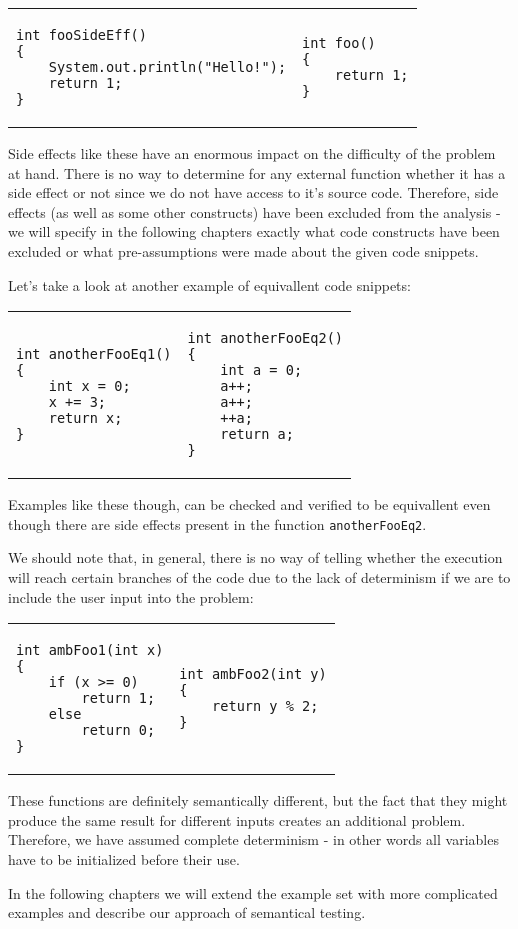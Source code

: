 \begin{tabular}{ p{4.5cm} p{4.5cm} }
\begin{lstlisting}
int fooSideEff()
{
    System.out.println("Hello!");
    return 1;
}
\end{lstlisting}
&
\begin{lstlisting}
int foo()
{
    return 1;
}
\end{lstlisting}
\end{tabular}

Side effects like these have an enormous impact on the difficulty of the problem at hand. There is no way to determine for any external function whether it has a side effect or not since we do not have access to it's source code. Therefore, side effects (as well as some other constructs) have been excluded from the analysis - we will specify in the following chapters exactly what code constructs have been excluded or what pre-assumptions were made about the given code snippets.

Let's take a look at another example of equivallent code snippets:

\begin{tabular}{ p{4.5cm} p{4.5cm} }
\begin{lstlisting}
int anotherFooEq1()
{
    int x = 0;
    x += 3;
    return x;
}
\end{lstlisting}
&
\begin{lstlisting}
int anotherFooEq2()
{
    int a = 0;
    a++;
    a++;
    ++a;
    return a;
}
\end{lstlisting}
\end{tabular}

Examples like these though, can be checked and verified to be equivallent even though there are side effects present in the function \texttt{anotherFooEq2}.

We should note that, in general, there is no way of telling whether the execution will reach certain branches of the code due to the lack of determinism if we are to include the user input into the problem:

\begin{tabular}{ p{4.5cm} p{4.5cm} }
\begin{lstlisting}
int ambFoo1(int x)
{
    if (x >= 0)
        return 1;
    else
        return 0;
}
\end{lstlisting}
&
\begin{lstlisting}
int ambFoo2(int y)
{
    return y % 2;
}
\end{lstlisting}
\end{tabular}

These functions are definitely semantically different, but the fact that they might produce the same result for different inputs creates an additional problem. Therefore, we have assumed complete determinism - in other words all variables have to be initialized before their use.

In the following chapters we will extend the example set with more complicated examples and describe our approach of semantical testing.
